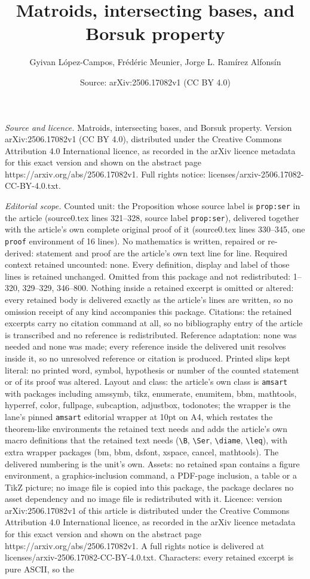 \documentclass[10pt,a4paper]{amsart}
\title[Matroids, intersecting bases, and Borsuk property]{Matroids, intersecting bases, and Borsuk property}
\author{Gyivan L\'opez-Campos, Fr\'ed\'eric Meunier, Jorge L. Ram\'irez Alfons\'in}
\date{Source: arXiv:2506.17082v1 (CC BY 4.0)}
\begin{document}
\maketitle

\noindent\emph{Source and licence.} Matroids, intersecting bases, and Borsuk property. Version arXiv:2506.17082v1 (CC BY 4.0), distributed under the Creative Commons Attribution 4.0 International licence, as recorded in the arXiv licence metadata for this exact version and shown on the abstract page https://arxiv.org/abs/2506.17082v1. Full rights notice: licenses/arxiv-2506.17082-CC-BY-4.0.txt.\par\smallskip

\noindent\textit{Editorial scope.} Counted unit: the Proposition whose source label is \texttt{prop:ser} in the article (source0.tex lines 321--328, source label \texttt{prop:ser}), delivered together with the article's own complete original proof of it (source0.tex lines 330--345, one \texttt{proof} environment of 16 lines). No mathematics is written, repaired or re-derived: statement and proof are the article's own text line for line. Required context retained uncounted: none. Every definition, display and label of those lines is retained unchanged. Omitted from this package and not redistributed: 1--320, 329--329, 346--800. Nothing inside a retained excerpt is omitted or altered: every retained body is delivered exactly as the article's lines are written, so no omission receipt of any kind accompanies this package. Citations: the retained excerpts carry no citation command at all, so no bibliography entry of the article is transcribed and no reference is redistributed. Reference adaptation: none was needed and none was made; every reference inside the delivered unit resolves inside it, so no unresolved reference or citation is produced. Printed slips kept literal: no printed word, symbol, hypothesis or number of the counted statement or of its proof was altered. Layout and class: the article's own class is \texttt{amsart} with packages including amssymb, tikz, enumerate, enumitem, bbm, mathtools, hyperref, color, fullpage, subcaption, adjustbox, todonotes; the wrapper is the lane's pinned \texttt{amsart} editorial wrapper at 10pt on A4, which restates the theorem-like environments the retained text needs and adds the article's own macro definitions that the retained text needs (\texttt{\textbackslash B}, \texttt{\textbackslash Ser}, \texttt{\textbackslash diame}, \texttt{\textbackslash leq}), with extra wrapper packages (bm, bbm, dsfont, xspace, cancel, mathtools). The delivered numbering is the unit's own. Assets: no retained span contains a figure environment, a graphics-inclusion command, a PDF-page inclusion, a table or a TikZ picture; no image file is copied into this package, the package declares no asset dependency and no image file is redistributed with it. Licence: version arXiv:2506.17082v1 of this article is distributed under the Creative Commons Attribution 4.0 International licence, as recorded in the arXiv licence metadata for this exact version and shown on the abstract page https://arxiv.org/abs/2506.17082v1. A full rights notice is delivered at licenses/arxiv-2506.17082-CC-BY-4.0.txt. Characters: every retained excerpt is pure ASCII, so the 
\end{document}
